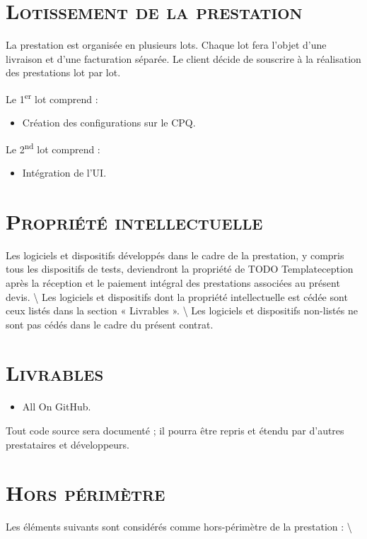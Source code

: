 \documentclass[10pt, a4paper]{article}
\begin{document}

\normalsize \rmfamily
    \section*{\textsc{Lotissement de la prestation}}
    La prestation est organisée en plusieurs lots. Chaque lot fera
    l'objet d'une livraison et d'une facturation séparée. Le client
    décide de souscrire à la réalisation des prestations lot par lot.

    Le 1\textsuperscript{er} lot comprend :

    \begin{itemize}
      \item Création des configurations sur le CPQ.
    \end{itemize}\bigskip

    Le 2\textsuperscript{nd} lot comprend :

    \begin{itemize}
      \item Intégration de l'UI.
    \end{itemize}\bigskip
    \section*{\textsc{Propriété intellectuelle}}
    Les logiciels et dispositifs développés dans le cadre de la
    prestation, y compris tous les dispositifs de tests, deviendront la
    propriété de TODO Templateception après la réception et le paiement
    intégral des prestations associées au présent devis.
    \textbackslash{} Les logiciels et dispositifs dont la propriété
    intellectuelle est cédée sont ceux listés dans la section «
    Livrables ». \textbackslash{} Les logiciels et dispositifs
    non-listés ne sont pas cédés dans le cadre du présent contrat.
    \section*{\textsc{Livrables}}
    \begin{itemize}
      \item All On GitHub.
    \end{itemize}\bigskip

    \noindent Tout code source sera documenté ; il pourra être repris et
    étendu par d'autres prestataires et développeurs.
    \section*{\textsc{Hors périmètre}}
    Les éléments suivants sont considérés comme hors-périmètre de la
    prestation : \textbackslash{}
\end{document}
